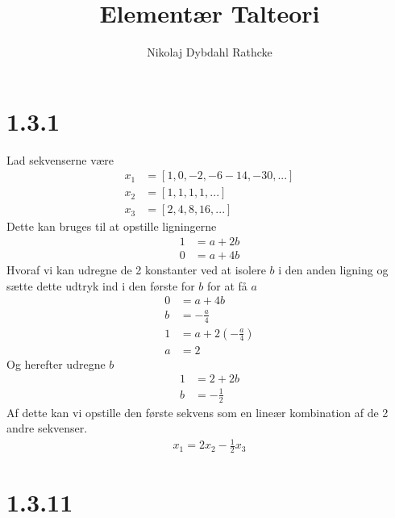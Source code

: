 \documentclass[12pt]{article}
\title{Elementær Talteori}
\author{Nikolaj Dybdahl Rathcke}
\begin{document}
\section{1.3.1}
Lad sekvenserne være
\begin{align*}
x_1&=[1,0,-2,-6-14,-30,...] \\
x_2&=[1,1,1,1,...] \\
x_3&=[2,4,8,16,...]
\end{align*}
Dette kan bruges til at opstille ligningerne
\begin{align*}
1&=a+2b \\
0&=a+4b
\end{align*}
Hvoraf vi kan udregne de 2 konstanter ved at isolere $b$ i den anden ligning og sætte dette udtryk ind i den første for $b$ for at få $a$
\begin{align*}
0&=a+4b \\
b&=-\frac{a}{4} \\
1&=a+2(-\frac{a}{4}) \\
a&=2
\end{align*}
Og herefter udregne $b$
\begin{align*}
1&=2+2b \\
b&=-\frac{1}{2}
\end{align*}
Af dette kan vi opstille den første sekvens som en lineær kombination af de 2 andre sekvenser.
\begin{align*}
x_1=2x_{2}-\frac{1}{2}x_{3}
\end{align*}

\section{1.3.11}
\end{document}

